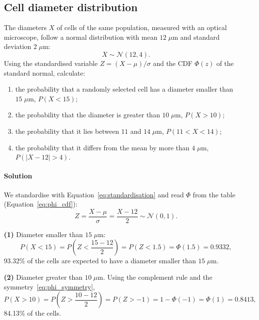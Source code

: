 \subsection{Cell diameter distribution}
\label{ex:cell_diameter}

The diameters $X$ of cells of the same population, measured with an optical microscope, follow a normal distribution with mean $12\;\mu\text{m}$ and standard deviation $2\;\mu\text{m}$:
\begin{equation*}
X \sim \mathcal{N}(12, 4).
\end{equation*}
Using the standardised variable $Z = (X - \mu)/\sigma$ and the CDF $\Phi(z)$ of the standard normal, calculate:
\begin{enumerate}[label=(\arabic*)]
    \item the probability that a randomly selected cell has a diameter smaller than $15\;\mu\text{m}$, $P(X < 15)$;
    \item the probability that the diameter is greater than $10\;\mu\text{m}$, $P(X > 10)$;
    \item the probability that it lies between $11$ and $14\;\mu\text{m}$, $P(11 < X < 14)$;
    \item the probability that it differs from the mean by more than $4\;\mu\text{m}$, $P(|X - 12| > 4)$.
\end{enumerate}

\paragraph{Solution} We standardise with Equation~\eqref{eq:standardisation} and read $\Phi$ from the table (Equation~\eqref{eq:phi_cdf}):
\begin{equation*}
Z = \frac{X - \mu}{\sigma} = \frac{X - 12}{2} \sim \mathcal{N}(0, 1).
\end{equation*}

\textbf{(1)} Diameter smaller than $15\;\mu\text{m}$:
\begin{equation*}
P(X < 15) = P\left(Z < \frac{15 - 12}{2}\right) = P(Z < 1.5) = \Phi(1.5) = 0.9332,
\end{equation*}
93.32\% of the cells are expected to have a diameter smaller than $15\;\mu\text{m}$.

\textbf{(2)} Diameter greater than $10\;\mu\text{m}$. Using the complement rule and the symmetry~\eqref{eq:phi_symmetry},
\begin{equation*}
P(X > 10) = P\left(Z > \frac{10 - 12}{2}\right) = P(Z > -1) = 1 - \Phi(-1) = \Phi(1) = 0.8413,
\end{equation*}
84.13\% of the cells.

